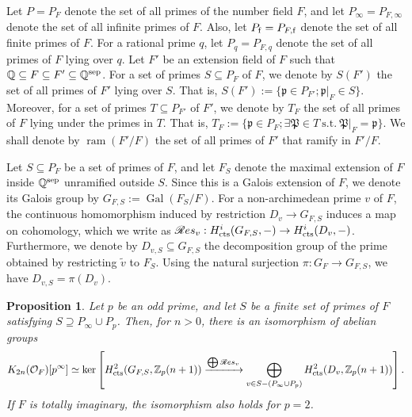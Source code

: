 \documentclass{article}
\numberwithin{equation}{section} %
\newtheorem{prop}[lemm]{Proposition}
\begin{document}
Let $P = P_F$ denote the set of all primes of the number field $F$, and let $P_\infty = P_{F,\infty}$ denote the set of all infinite primes of $F$. Also, let $P_{\rm f} = P_{F,\mathrm{f}}$ denote the set of all finite primes of $F$. For a rational prime $q$, let $P_q = P_{F,q}$ denote the set of all primes of $F$ lying over $q$. Let $F'$ be an extension field of $F$ such that $\mathbb{Q} \subseteq F \subseteq F' \subseteq \mathbb{Q}^{\rm sep}$. For a set of primes $S \subseteq P_F$ of $F$, we denote by $S(F')$ the set of all primes of $F'$ lying over $S$. That is, $S(F') := \{\mathfrak{p} \in P_{F'} ; \mathfrak{p}|_{F} \in S \}$. Moreover, for a set of primes $T \subseteq P_{F'}$ of $F'$, we denote by $T_F$ the set of all primes of $F$ lying under the primes in $T$. That is, $T_F := \{\mathfrak{p} \in P_F; \exists \mathfrak{P} \in T \ \mathrm{s.t.} \ \mathfrak{P}|_{F} = \mathfrak{p}\}$. We shall denote by $\operatorname{ram}(F'/F)$ the set of all primes of $F'$ that ramify in $F'/F$.
  
Let $S \subseteq P_F$ be a set of primes of $F$, and let $F_S$ denote the maximal extension of $F$ inside $\mathbb{Q}^{\rm sep}$ unramified outside $S$. Since this is a Galois extension of $F$, we denote its Galois group by $G_{F,S} := \operatorname{Gal}(F_S/F)$. For a non-archimedean prime $v$ of $F$, the continuous homomorphism induced by restriction $D_{v} \to G_{F,S}$ induces a map on cohomology, which we write as $\mathscr{R}es_v: H_{\rm cts}^i(G_{F,S},-) \to H_{\rm cts}^i(D_v,-) $. Furthermore, we denote by $D_{v,S} \subseteq G_{F,S}$ the decomposition group of the prime obtained by restricting $\widetilde{v}$ to $F_S$. Using the natural surjection $\pi: G_F \to G_{F,S}$, we have $D_{v,S} = \pi(D_v)$.

\begin{prop}
  \label{eni4vmo34vo}
  Let $p$ be an odd prime, and let $S$ be a finite set of primes of $F$ satisfying $S \supseteq P_\infty \cup P_{p}$. Then, for $n > 0$, there is an isomorphism of abelian groups
  \[
    K_{2n}(\mathcal{O}_F)[p^\infty] \simeq \operatorname{ker}\left[H^2_{\rm cts}(G_{F,S}, \mathbb{Z}_p(n+1)) \xrightarrow{\bigoplus \mathscr{R}es_v} \bigoplus_{v \in S - (P_\infty \cup P_p)}H^2_{\rm cts}(D_{v}, \mathbb{Z}_p(n+1))\right].
  \]
  If $F$ is totally imaginary, the isomorphism also holds for $p=2$.
\end{prop}
\end{document}
